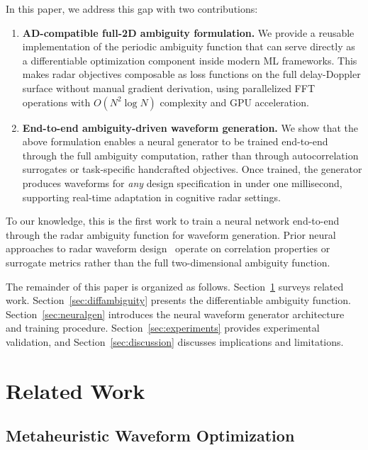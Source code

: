 \documentclass[journal]{IEEEtran}
\begin{document}
In this paper, we address this gap with two contributions:

\begin{enumerate}
    \item \textbf{AD-compatible full-2D ambiguity formulation.} We provide a reusable implementation of the periodic ambiguity function that can serve directly as a differentiable optimization component inside modern ML frameworks.
    This makes radar objectives composable as loss functions on the full delay-Doppler surface without manual gradient derivation, using parallelized FFT operations with $O(N^2 \log N)$ complexity and GPU acceleration.

    \item \textbf{End-to-end ambiguity-driven waveform generation.} We show that the above formulation enables a neural generator to be trained end-to-end through the full ambiguity computation, rather than through autocorrelation surrogates or task-specific handcrafted objectives.
    Once trained, the generator produces waveforms for \emph{any} design specification in under one millisecond, supporting real-time adaptation in cognitive radar settings.
\end{enumerate}

To our knowledge, this is the first work to train a neural network end-to-end through the radar ambiguity function for waveform generation.
Prior neural approaches to radar waveform design~\cite{kang2023deep, ziemann2023adaptive, senica2024artificial, rezaei2023learning} operate on correlation properties or surrogate metrics rather than the full two-dimensional ambiguity function.

The remainder of this paper is organized as follows.
Section~\ref{sec:related} surveys related work.
Section~\ref{sec:diffambiguity} presents the differentiable ambiguity function.
Section~\ref{sec:neuralgen} introduces the neural waveform generator architecture and training procedure.
Section~\ref{sec:experiments} provides experimental validation, and Section~\ref{sec:discussion} discusses implications and limitations.


\section{Related Work}
\label{sec:related}

\subsection{Metaheuristic Waveform Optimization}
\end{document}
